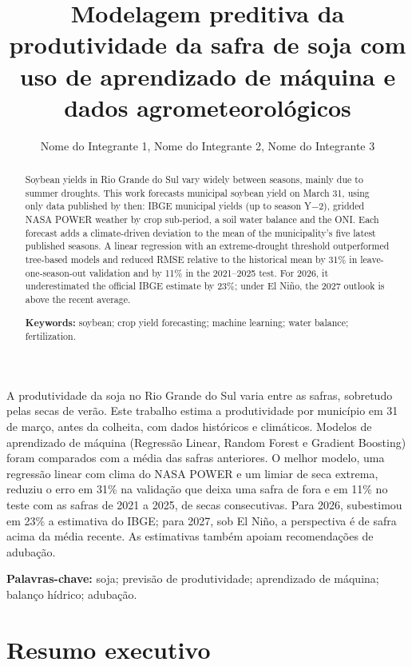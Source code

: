 \documentclass[12pt]{article}
\title{Modelagem preditiva da produtividade da safra de soja com uso de aprendizado de máquina e dados agrometeorológicos}
\author{Nome do Integrante 1\inst{1}, Nome do Integrante 2\inst{1}, Nome do Integrante 3\inst{1}}
\begin{document}
\maketitle

\begin{abstract}
  Soybean yields in Rio Grande do Sul vary widely between seasons, mainly
  due to summer droughts. This work forecasts municipal soybean yield on
  March 31, using only data published by then: IBGE municipal yields (up to
  season Y$-$2), gridded NASA POWER weather by crop sub-period, a soil
  water balance and the ONI. Each forecast adds a climate-driven deviation
  to the mean of the municipality's five latest published seasons. A linear
  regression with an extreme-drought threshold outperformed tree-based
  models and reduced RMSE relative to the historical mean by 31\% in
  leave-one-season-out validation and by 11\% in the 2021--2025 test. For
  2026, it underestimated the official IBGE estimate by 23\%; under El Niño,
  the 2027 outlook is above the recent average.

  \noindent\textbf{Keywords:} soybean; crop yield forecasting; machine
  learning; water balance; fertilization.
\end{abstract}

\begin{resumo}
  A produtividade da soja no Rio Grande do Sul varia entre as safras,
  sobretudo pelas secas de verão. Este trabalho estima a produtividade por
  município em 31 de março, antes da colheita, com dados históricos e
  climáticos. Modelos de aprendizado de máquina (Regressão Linear, Random
  Forest e Gradient Boosting) foram comparados com a média das safras
  anteriores. O melhor modelo, uma regressão linear com clima do NASA
  POWER e um limiar de seca extrema, reduziu o erro em 31\% na validação
  que deixa uma safra de fora e em 11\% no teste com as safras de 2021 a
  2025, de secas consecutivas. Para 2026, subestimou em 23\% a estimativa
  do IBGE; para 2027, sob El Niño, a perspectiva é de safra acima da média
  recente. As estimativas também apoiam recomendações de adubação.

  \noindent\textbf{Palavras-chave:} soja; previsão de produtividade;
  aprendizado de máquina; balanço hídrico; adubação.
\end{resumo}

\section*{Resumo executivo}
\end{document}
